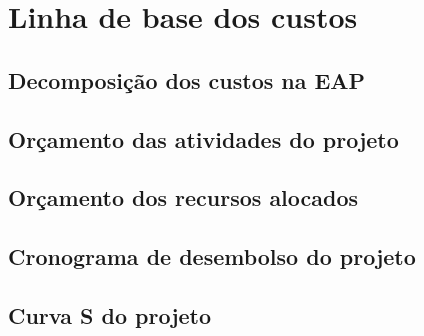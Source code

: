 \chapter{Linha de base dos custos}
\label{ch:cost-baseline}


\section{Decomposição dos custos na EAP}

\section{Orçamento das atividades do projeto}

\section{Orçamento dos recursos alocados}

\section{Cronograma de desembolso do projeto}

\section{Curva S do projeto}